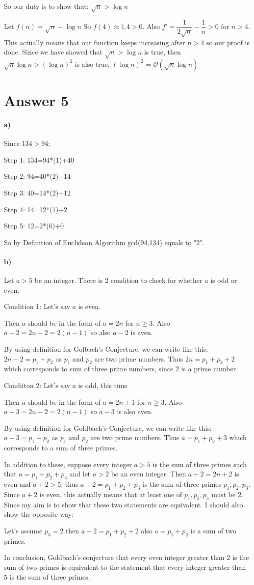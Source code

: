 \documentclass[12pt]{article}
\begin{document}
So our duty is to show that:
$\sqrt{n} > \log n$

Let $f(n)=\sqrt{n} - \log n$ So $f(4)\approx1.4>0$. Also $f'=\dfrac{1}{2\sqrt{n}}-\dfrac{1}{n} >0$ for $n>4$. This actually means that our function keeps increasing after $n>4$ so our proof is done. Since we have showed that $\sqrt{n} > \log n$ is true, then $\sqrt{n}\log n>(\log n)^2$ is also true.  $(\log n)^2$ = $\mathcal{O}(\sqrt{n}\log n)$


\section*{Answer 5}
\paragraph{a)}
Since 134$>$94;

Step 1: 134=94*(1)+40


Step 2: 94=40*(2)+14


Step 3: 40=14*(2)+12


Step 4: 14=12*(1)+2


Step 5: 12=2*(6)+0

So by Definition of Euclidean Algorithm gcd(94,134) equals to "2".


\paragraph{b)}
Let $a>5$ be an integer. There is 2 condition to check for whether $a$ is odd or even.

Condition 1: Let's say $a$ is even.

Then $a$ should be in the form of $a=2n$ for $n\geq 3$. Also $a-2=2n-2=2(n-1)$ so also $a -2$ is even.

By using definition for Golbach's Conjecture, we can write like this:
$2n-2=p_1+p_2$ as $p_1$ and $p_2$ are two prime numbers. Thus $2n=p_1+p_2+2$ which corresponds to sum of three prime numbers, since 2 is a prime number.

Condiiton 2: Let's say $a$ is odd, this time

Then $a$ should be in the form of $a=2n+1$ for $n\geq 3$. Also $a-3=2n-2=2(n-1)$ so $a-3$ is also even.

By using definition for Goldbach's Conjecture, we can write like this:
$a-3=p_1+p_2$ as $p_1$ and $p_2$ are two prime numbers. Thus $a=p_1+p_2+3$ which corresponds to a sum of three primes.

In addition to these, suppose every integer $a>5$ is the sum of three primes such that $a=p_1+p_2+p_3$ and let $a>2$ be an even integer. Then $a+2=2n+2$ is even and $a+2>5$, thus $a+2=p_1+p_2+p_3$ is the sum of three primes $p_1, p_2, p_3$. Since $a+2$ is even, this actually means that at least one of $p_1, p_2, p_3$ must be $2$. Since my aim is to show that these two statements are equivalent. I should also show the opposite way:

Let's assume $p_3=2$ then $a+2=p_1+p_2+2$ also $a=p_1+p_2$ is a sum of two primes. 

In conclusion, Goldbach’s conjecture that every even integer greater than $2$ is the sum of two primes is equivalent to the statement that every integer greater than $5$ is the sum of three
primes.
\end{document}

